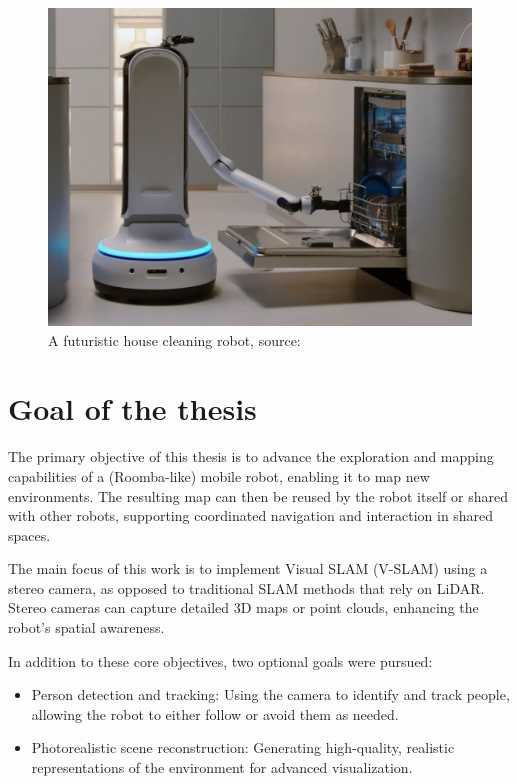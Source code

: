 \FloatBarrier
\begin{figure}[htbp]
	\centering
	\includegraphics[width=150mm, keepaspectratio]{figures_jpg/samsung-bot-handy.jpg}
	\caption{A futuristic house cleaning robot, source:~\cite{futuristic_household_robot}}
	\label{fig:futuristic_house_cleaning_robot}
\end{figure}
\FloatBarrier

\section{Goal of the thesis}

The primary objective of this thesis is to advance the exploration and mapping capabilities of a (Roomba-like) mobile robot, enabling it to map new environments. The resulting map can then be reused by the robot itself or shared with other robots, supporting coordinated navigation and interaction in shared spaces.

The main focus of this work is to implement Visual SLAM (V-SLAM) using a stereo camera, as opposed to traditional SLAM methods that rely on LiDAR. Stereo cameras can capture detailed 3D maps or point clouds, enhancing the robot's spatial awareness.

In addition to these core objectives, two optional goals were pursued:
\begin{itemize}
\setlength\itemsep{0em}
    \item Person detection and tracking: Using the camera to identify and track people, allowing the robot to either follow or avoid them as needed.
    \item Photorealistic scene reconstruction: Generating high-quality, realistic representations of the environment for advanced visualization.
\end{itemize}


